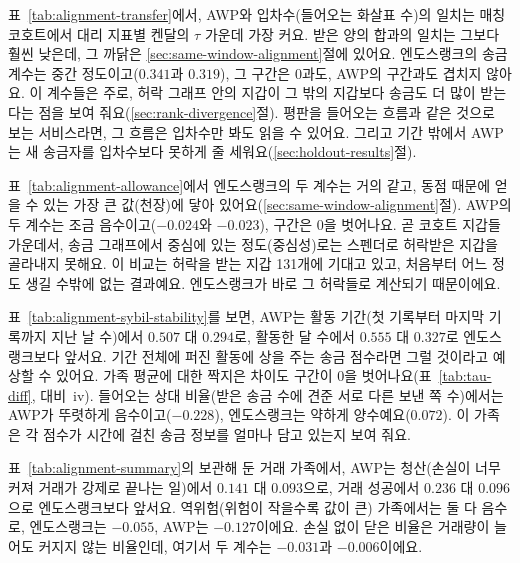 


표~\ref{tab:alignment-transfer}에서, AWP와 입차수(들어오는 화살표 수)의 일치는 매칭 코호트에서 대리 지표별 켄달의 $\tau$ 가운데 가장 커요. 받은 양의 합과의 일치는 그보다 훨씬 낮은데, 그 까닭은 \ref{sec:same-window-alignment}절에 있어요. 엔도스랭크의 송금 계수는 중간 정도이고($0.341$과 $0.319$), 그 구간은 0과도, AWP의 구간과도 겹치지 않아요. 이 계수들은 주로, 허락 그래프 안의 지갑이 그 밖의 지갑보다 송금도 더 많이 받는다는 점을 보여 줘요(\ref{sec:rank-divergence}절). 평판을 들어오는 흐름과 같은 것으로 보는 서비스라면, 그 흐름은 입차수만 봐도 읽을 수 있어요. 그리고 기간 밖에서 AWP는 새 송금자를 입차수보다 못하게 줄 세워요(\ref{sec:holdout-results}절).




표~\ref{tab:alignment-allowance}에서 엔도스랭크의 두 계수는 거의 같고, 동점 때문에 얻을 수 있는 가장 큰 값(천장)에 닿아 있어요(\ref{sec:same-window-alignment}절). AWP의 두 계수는 조금 음수이고($-0.024$와 $-0.023$), 구간은 0을 벗어나요. 곧 코호트 지갑들 가운데서, 송금 그래프에서 중심에 있는 정도(중심성)로는 스펜더로 허락받은 지갑을 골라내지 못해요. 이 비교는 허락을 받는 지갑 131개에 기대고 있고, 처음부터 어느 정도 생길 수밖에 없는 결과예요. 엔도스랭크가 바로 그 허락들로 계산되기 때문이에요.




표~\ref{tab:alignment-sybil-stability}를 보면, AWP는 활동 기간(첫 기록부터 마지막 기록까지 지난 날 수)에서 $0.507$ 대 $0.294$로, 활동한 달 수에서 $0.555$ 대 $0.327$로 엔도스랭크보다 앞서요. 기간 전체에 퍼진 활동에 상을 주는 송금 점수라면 그럴 것이라고 예상할 수 있어요. 가족 평균에 대한 짝지은 차이도 구간이 0을 벗어나요(표~\ref{tab:tau-diff}, 대비~iv). 들어오는 상대 비율(받은 송금 수에 견준 서로 다른 보낸 쪽 수)에서는 AWP가 뚜렷하게 음수이고($-0.228$), 엔도스랭크는 약하게 양수예요($0.072$). 이 가족은 각 점수가 시간에 걸친 송금 정보를 얼마나 담고 있는지 보여 줘요.

표~\ref{tab:alignment-summary}의 보관해 둔 거래 가족에서, AWP는 청산(손실이 너무 커져 거래가 강제로 끝나는 일)에서 $0.141$ 대 $0.093$으로, 거래 성공에서 $0.236$ 대 $0.096$으로 엔도스랭크보다 앞서요. 역위험(위험이 작을수록 값이 큰) 가족에서는 둘 다 음수로, 엔도스랭크는 $-0.055$, AWP는 $-0.127$이에요. 손실 없이 닫은 비율은 거래량이 늘어도 커지지 않는 비율인데, 여기서 두 계수는 $-0.031$과 $-0.006$이에요.

